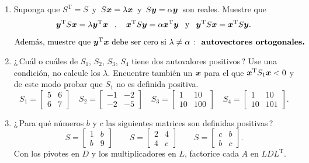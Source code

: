 \documentclass[12pt,a4paper]{article}
\newcommand{\bi}[1]{\hbox{\boldmath$#1$}}
\newcommand\1{\mbox{\,\vrule height-0.8pt depth1.0pt width2pc\,}}
\newcommand\2{\mbox{\,\vrule height-0.8pt depth1.0pt width1pc\,}}
\DeclareRobustCommand\transp{^{\mathrm{T}}}
\newcommand{\la}{\lambda}
\begin{document}
\begin{enumerate}
\item Suponga que $S\transp=S\,$ y $\,S\bi{x}=\lambda\bi{x}\,$ y $\,S\bi{y}=\alpha\bi{y}\,$ son reales. Muestre que
$$
\bi{y}\transp S\bi{x}=\lambda\bi{y}\transp\bi{x}\quad\text{, }\quad\bi{x}\transp S\bi{y}=\alpha\bi{x}\transp\bi{y}\quad\text{y}\quad\bi{y}\transp S\bi{x}=\bi{x}\transp S\bi{y}.$$
$\text{Además, muestre que }\bi{y}\transp\bi{x}\text{ debe ser cero si } \lambda\neq\alpha\,: \textbf{ autovectores ortogonales.}$ 

\item ¿\,Cuál o cuáles de $S_1$, $S_2$, $S_3$, $S_4$ tiene dos autovalores positivos\,? Use una condición, no calcule los $\la$. Encuentre también un $\bi x$ para el que $\bi x\transp S_1 \bi x < 0$ y de este modo probar que $S_1$ no es definida positiva.
%
\[
S_1=\begin{bmatrix} 5&6\\ 6&7\end{bmatrix}\quad
S_2=\begin{bmatrix}  -1 & -2 \\  -2 &
    -5\end{bmatrix}\quad S_3=\begin{bmatrix} 1&10\\
  10&100\end{bmatrix} \quad S_4=\begin{bmatrix} 1&10\\
  10&101\end{bmatrix}.
\]
%
\item ¿\,Para qué números $b$ y $c$ las siguientes matrices son definidas positivas\,?
%
\[
S=\begin{bmatrix} 1&b\\ b&9\end{bmatrix}\qquad
S=\begin{bmatrix} 2&4\\ 4&c\end{bmatrix}\qquad
S=\begin{bmatrix} c&b\\ b&c\end{bmatrix}.
\]
%
Con los pivotes en $D$ y los multiplicadores en $L$, factorice cada $A$ en $LDL\transp$.


\end{enumerate}
\end{document}
